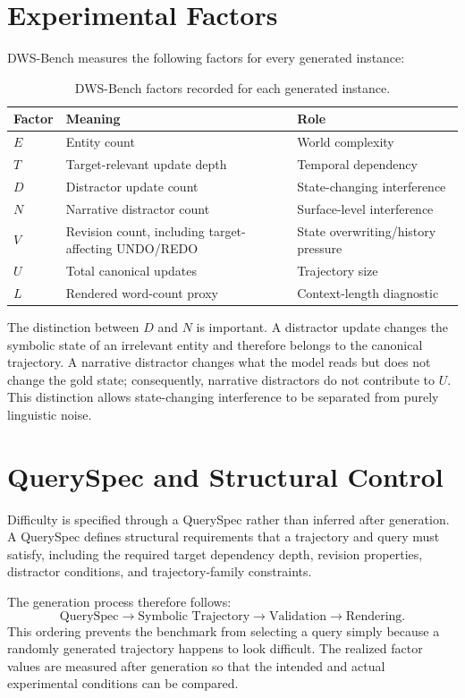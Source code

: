 \documentclass{iutbscthesis}
\begin{document}
\section{Experimental Factors}
DWS-Bench measures the following factors for every generated instance:
\begin{table}[H]
\centering
\renewcommand{\arraystretch}{1.3}
\begin{tabular}{p{}p{}p{}}
\toprule
\textbf{Factor} & \textbf{Meaning} & \textbf{Role} \\
\midrule
$E$ & Entity count & World complexity \\
$T$ & Target-relevant update depth & Temporal dependency \\
$D$ & Distractor update count & State-changing interference \\
$N$ & Narrative distractor count & Surface-level interference \\
$V$ & Revision count, including target-affecting UNDO/REDO & State overwriting/history pressure \\
$U$ & Total canonical updates & Trajectory size \\
$L$ & Rendered word-count proxy & Context-length diagnostic \\
\bottomrule
\end{tabular}
\caption{DWS-Bench factors recorded for each generated instance.}
\label{tab:experimental-contract}
\end{table}

The distinction between $D$ and $N$ is important. A distractor update changes the symbolic state of an
irrelevant entity and therefore belongs to the canonical trajectory. A narrative distractor changes
what the model reads but does not change the gold state; consequently, narrative distractors do not
contribute to $U$. This distinction allows state-changing interference to be separated from purely
linguistic noise.

\section{QuerySpec and Structural Control}
Difficulty is specified through a QuerySpec rather than inferred after generation. A QuerySpec defines
structural requirements that a trajectory and query must satisfy, including the required target
dependency depth, revision properties, distractor conditions, and trajectory-family constraints.

The generation process therefore follows:
\[
\text{QuerySpec}
\rightarrow
\text{Symbolic Trajectory}
\rightarrow
\text{Validation}
\rightarrow
\text{Rendering}.
\]
This ordering prevents the benchmark from selecting a query simply because a randomly generated
trajectory happens to look difficult. The realized factor values are measured after generation so that
the intended and actual experimental conditions can be compared.
\end{document}
